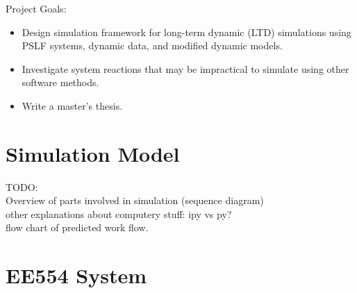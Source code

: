 \documentclass[14pt, unknownkeysallowed]{beamer}
\begin{document}
\begin{frame}
Project Goals:
\begin{itemize}
	\item Design simulation framework for long-term dynamic (LTD) simulations using PSLF systems, dynamic data, and modified dynamic models.
	\item Investigate  system reactions that may be impractical to simulate using other software methods.
	\item Write a master's thesis.
\end{itemize}

\end{frame}
\section{Simulation Model}
\begin{frame}
TODO:\\
Overview of parts involved in simulation (sequence diagram)\\
other explanations about computery stuff: ipy vs py? \\
flow chart of predicted work flow.
\end{frame}

\section{EE554 System}
\end{document}
